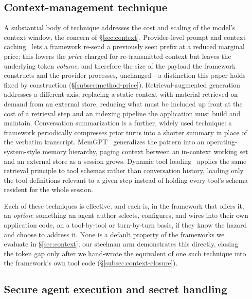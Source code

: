 \subsection{Context-management technique}
\label{subsec:rw-context}

A substantial body of technique addresses the cost and scaling of the
model's context window, the concern of \S\ref{sec:context}. Provider-level
prompt and context caching~\cite{anthropic_promptcaching,
google_contextcaching} lets a framework re-send a previously seen prefix
at a reduced marginal price; this lowers the \emph{price} charged for
re-transmitted context but leaves the underlying token \emph{volume}, and
therefore the size of the payload the framework constructs and the
provider processes, unchanged---a distinction this paper holds fixed by
construction (\S\ref{subsec:method-price}). Retrieval-augmented
generation~\cite{lewis2020} addresses a different axis, replacing a static
context with material retrieved on demand from an external store,
reducing what must be included up front at the cost of a retrieval step
and an indexing pipeline the application must build and maintain.
Conversation summarization is a further, widely used technique: a
framework periodically compresses prior turns into a shorter summary
in place of the verbatim transcript. MemGPT~\cite{packer2023} generalizes
the pattern into an operating-system-style memory hierarchy, paging
context between an in-context working set and an external store as a
session grows. Dynamic tool loading~\cite{gansun2025} applies the same
retrieval principle to tool schemas rather than conversation history,
loading only the tool definitions relevant to a given step instead of
holding every tool's schema resident for the whole session.

Each of these techniques is effective, and each is, in the framework
that offers it, an \emph{option}: something an agent author selects,
configures, and wires into their own application code, on a
tool-by-tool or turn-by-turn basis, if they know the hazard and choose to
address it. None is a default property of the frameworks we evaluate in
\S\ref{sec:context}; our steelman arm demonstrates this directly, closing
the token gap only after we hand-wrote the equivalent of one such
technique into the framework's own tool code
(\S\ref{subsec:context-closure}).

\subsection{Secure agent execution and secret handling}
\label{subsec:rw-security}

